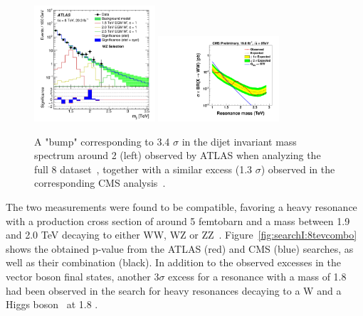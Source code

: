 \begin{figure}[h!] 
    \centering
    \includegraphics[width=0.4\textwidth]{figures/analysis/search1/misc/atlas_8tev.png}
    \includegraphics[width=0.4\textwidth]{figures/analysis/search1/misc/EXO-12-024_gWW.pdf}
    \caption{A "bump" corresponding to 3.4 $\sigma$ in the dijet invariant mass spectrum around 2 \TeV (left) observed by ATLAS when analyzing the full 8 \TeV dataset~\cite{Aad2015}, together with a similar excess (1.3 $\sigma$) observed in the corresponding CMS analysis~\cite{Khachatryan:1700394}.}
    \label{fig:searchI:8tev}
\end{figure}
The two measurements were found to be compatible, favoring a heavy resonance with a production cross section of around 5 femtobarn and a mass between 1.9 and 2.0 TeV decaying to either WW, WZ or ZZ~\cite{Dias:2015mhm}. Figure~\ref{fig:searchI:8tevcombo} shows the obtained p-value from the ATLAS (red) and CMS (blue) searches, as well as their combination (black). In addition to the observed excesses in the vector boson final states, another  $3 \sigma$ excess for a resonance with a mass of 1.8 \TeV had been observed in the search for heavy resonances decaying to a W and a Higgs boson~\cite{Khachatryan:2016yji} at 1.8 \TeV.
